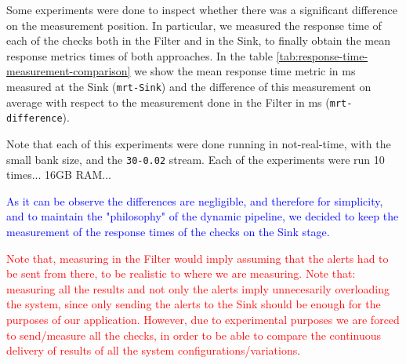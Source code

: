 Some experiments were done to inspect whether there was a significant difference on the measurement position. In particular, we measured the response time of each of the checks both in the Filter and in the Sink, to finally obtain the mean response metrics times of both approaches. In the table \ref{tab:response-time-measurement-comparison} we show the mean response time metric in ms measured at the Sink (\texttt{mrt-Sink}) and the difference of this measurement on average with respect to the measurement done in the Filter in ms (\texttt{mrt-difference}).

Note that each of this experiments were done running in not-real-time, with the small bank size, and the \texttt{30-0.02} stream. Each of the experiments were run 10 times... 16GB RAM...

\textcolor{blue}{As it can be observe the differences are negligible, and therefore for simplicity, and to maintain the "philosophy" of the dynamic pipeline, we decided to keep the measurement of the response times of the checks on the Sink stage.}

\textcolor{red}{Note that, measuring in the Filter would imply assuming that the alerts had to be sent from there, to be realistic to where we are measuring.}
\textcolor{red}{Note that: measuring all the results and not only the alerts imply unnecesarily overloading the system, since only sending the alerts to the Sink should be enough for the purposes of our application. However, due to experimental purposes we are forced to send/measure all the checks, in order to be able to compare the continuous delivery of results of all the system configurations/variations}.

